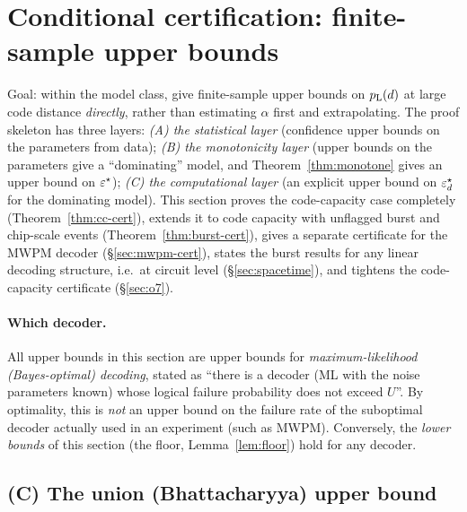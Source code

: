 \section{Conditional certification: finite-sample upper bounds}\label{sec:cert}

Goal: within the model class, give finite-sample upper bounds on $p_{\mathrm{L}}(d)$ at large code distance \emph{directly}, rather than estimating $\alpha$ first and extrapolating.
The proof skeleton has three layers: \emph{(A) the statistical layer} (confidence upper bounds on the parameters from data); \emph{(B) the monotonicity layer} (upper bounds on the parameters give a ``dominating'' model,
and Theorem~\ref{thm:monotone} gives an upper bound on $\varepsilon^{\star}$); \emph{(C) the computational layer} (an explicit upper bound on $\varepsilon^{\star}_d$ for the dominating model).
This section proves the code-capacity case completely (Theorem~\ref{thm:cc-cert}), extends it to code capacity with unflagged burst and chip-scale events (Theorem~\ref{thm:burst-cert}),
gives a separate certificate for the MWPM decoder (\S\ref{sec:mwpm-cert}), states the burst results for any linear decoding structure, i.e.\ at circuit level (\S\ref{sec:spacetime}), and tightens the code-capacity certificate (\S\ref{sec:o7}).

\paragraph{Which decoder.}
All upper bounds in this section are upper bounds for \emph{maximum-likelihood (Bayes-optimal) decoding}, stated as ``there is a decoder (ML with the noise parameters known)
whose logical failure probability does not exceed $U$''. By optimality, this is \emph{not} an upper bound on the failure rate of the suboptimal decoder actually used in an experiment (such as MWPM).
Conversely, the \emph{lower bounds} of this section (the floor, Lemma~\ref{lem:floor}) hold for any decoder.

\subsection{(C) The union (Bhattacharyya) upper bound}

